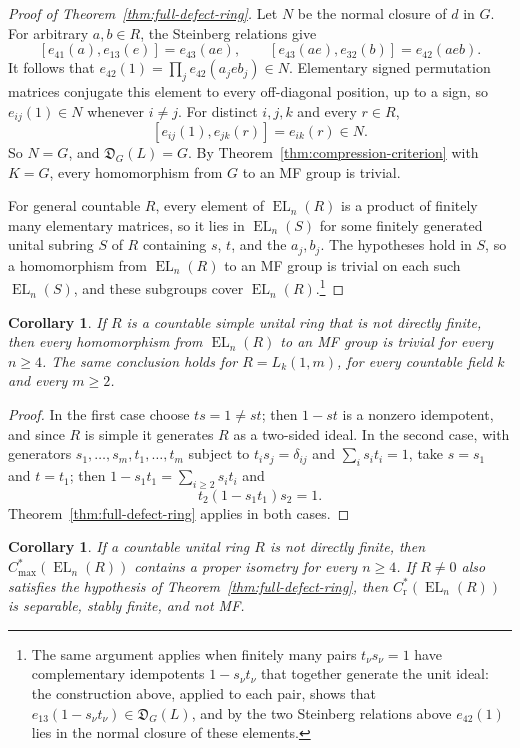 \documentclass[11pt]{amsart}
\newtheorem{corollary}[theorem]{Corollary}
\theoremstyle{plain}
\newcommand{\EL}{\operatorname{EL}}
\begin{document}
\begin{proof}[Proof of Theorem~\ref{thm:full-defect-ring}]
Let $N$ be the normal closure of $d$ in $G$.  For arbitrary $a,b\in R$,
the Steinberg relations give
\[
 [e_{41}(a),e_{13}(e)]=e_{43}(ae),\qquad
 [e_{43}(ae),e_{32}(b)]=e_{42}(aeb).
\]
It follows that
$e_{42}(1)=\prod_j e_{42}(a_jeb_j)\in N$.
Elementary signed permutation matrices conjugate this element to every
off-diagonal position, up to a sign, so $e_{ij}(1)\in N$ whenever $i\ne j$.
For distinct $i,j,k$ and every $r\in R$,
\[
 [e_{ij}(1),e_{jk}(r)]=e_{ik}(r)\in N.
\]
So $N=G$, and $\mathfrak D_G(L)=G$.  By
Theorem~\ref{thm:compression-criterion} with $K=G$, every homomorphism
from $G$ to an MF group is trivial.

For general countable $R$, every element of $\EL_n(R)$ is a product of
finitely many elementary matrices, so it lies in $\EL_n(S)$ for some
finitely generated unital subring $S$ of $R$ containing $s$, $t$, and
the $a_j,b_j$.  The hypotheses hold in $S$, so a homomorphism from
$\EL_n(R)$ to an MF group is trivial on each such $\EL_n(S)$, and these
subgroups cover $\EL_n(R)$.\footnote{The same argument applies when
finitely many pairs $t_\nu s_\nu=1$ have complementary idempotents
$1-s_\nu t_\nu$ that together generate the unit ideal: the construction
above, applied to each pair, shows that
$e_{13}(1-s_\nu t_\nu)\in\mathfrak D_G(L)$, and by the two Steinberg
relations above $e_{42}(1)$ lies in the normal closure of these
elements.}
\end{proof}

\begin{corollary}\label{cor:simple-infinite-ring}
If $R$ is a countable simple unital ring that is not directly finite,
then every homomorphism from $\EL_n(R)$ to an MF group is trivial for
every $n\ge4$.
The same conclusion holds for $R=L_k(1,m)$, for every countable field
$k$ and every $m\ge2$.
\end{corollary}

\begin{proof}
In the first case choose $ts=1\ne st$; then $1-st$ is a nonzero
idempotent, and since $R$ is simple it generates $R$ as a two-sided
ideal.  In the second case, with generators $s_1,\dots,s_m,t_1,\dots,t_m$
subject to $t_is_j=\delta_{ij}$ and $\sum_is_it_i=1$, take $s=s_1$ and
$t=t_1$; then $1-s_1t_1=\sum_{i\ge2}s_it_i$ and
\[
 t_2(1-s_1t_1)s_2=1.
\]
Theorem~\ref{thm:full-defect-ring} applies in both cases.
\end{proof}

\begin{corollary}\label{cor:one-sided-ring-maximal}
If a countable unital ring $R$ is not directly finite, then
$C^*_{\max}(\EL_n(R))$ contains a proper isometry for every $n\ge4$.
If $R\ne0$ also satisfies the hypothesis of
Theorem~\ref{thm:full-defect-ring}, then
$C^*_{\mathrm r}(\EL_n(R))$ is separable, stably finite, and not MF.
\end{corollary}
\end{document}
